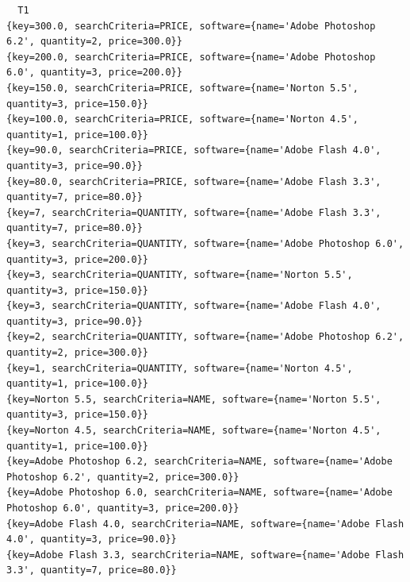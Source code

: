 \documentclass[a4paper]{article}
\begin{document}
\begin{large}
  \begin{lstlisting}
  T1
{key=300.0, searchCriteria=PRICE, software={name='Adobe Photoshop 6.2', quantity=2, price=300.0}}
{key=200.0, searchCriteria=PRICE, software={name='Adobe Photoshop 6.0', quantity=3, price=200.0}}
{key=150.0, searchCriteria=PRICE, software={name='Norton 5.5', quantity=3, price=150.0}}
{key=100.0, searchCriteria=PRICE, software={name='Norton 4.5', quantity=1, price=100.0}}
{key=90.0, searchCriteria=PRICE, software={name='Adobe Flash 4.0', quantity=3, price=90.0}}
{key=80.0, searchCriteria=PRICE, software={name='Adobe Flash 3.3', quantity=7, price=80.0}}
{key=7, searchCriteria=QUANTITY, software={name='Adobe Flash 3.3', quantity=7, price=80.0}}
{key=3, searchCriteria=QUANTITY, software={name='Adobe Photoshop 6.0', quantity=3, price=200.0}}
{key=3, searchCriteria=QUANTITY, software={name='Norton 5.5', quantity=3, price=150.0}}
{key=3, searchCriteria=QUANTITY, software={name='Adobe Flash 4.0', quantity=3, price=90.0}}
{key=2, searchCriteria=QUANTITY, software={name='Adobe Photoshop 6.2', quantity=2, price=300.0}}
{key=1, searchCriteria=QUANTITY, software={name='Norton 4.5', quantity=1, price=100.0}}
{key=Norton 5.5, searchCriteria=NAME, software={name='Norton 5.5', quantity=3, price=150.0}}
{key=Norton 4.5, searchCriteria=NAME, software={name='Norton 4.5', quantity=1, price=100.0}}
{key=Adobe Photoshop 6.2, searchCriteria=NAME, software={name='Adobe Photoshop 6.2', quantity=2, price=300.0}}
{key=Adobe Photoshop 6.0, searchCriteria=NAME, software={name='Adobe Photoshop 6.0', quantity=3, price=200.0}}
{key=Adobe Flash 4.0, searchCriteria=NAME, software={name='Adobe Flash 4.0', quantity=3, price=90.0}}
{key=Adobe Flash 3.3, searchCriteria=NAME, software={name='Adobe Flash 3.3', quantity=7, price=80.0}}


\end{lstlisting}
\end{large}
\end{document}
